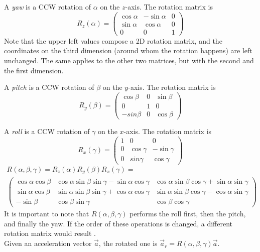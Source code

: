 A \textit{yaw} is a CCW rotation of $\alpha$ on the $z$-axis. The rotation matrix is
\[
	R_z(\alpha) =
	\begin{pmatrix}
		\cos\alpha & -\sin\alpha & 0 \\
		\sin\alpha & \cos\alpha & 0 \\
		0 & 0 & 1
	\end{pmatrix}
\]
Note that the upper left values compose a 2D rotation matrix, and the coordinates on the third dimension (around whom the rotation happens) are left unchanged. The same applies to the other two matrices, but with the second and the first dimension.
\bigbreak

A \textit{pitch} is a CCW rotation of $\beta$ on the $y$-axis. The rotation matrix is
\[
	R_y(\beta) =
	\begin{pmatrix}
		\cos\beta & 0 & \sin\beta \\
		0 & 1 & 0 \\
		-sin\beta & 0 & \cos\beta
	\end{pmatrix}
\]

A \textit{roll} is a CCW rotation of $\gamma$ on the $x$-axis. The rotation matrix is
\[
	R_x(\gamma) =
	\begin{pmatrix}
		1 & 0 & 0 \\
		0 & \cos\gamma & -\sin\gamma \\
		0 & sin\gamma & \cos\gamma
	\end{pmatrix}
\]
\begin{gather*}
	R(\alpha, \beta, \gamma) = R_z(\alpha) R_y(\beta) R_x(\gamma) = \\
	\begin{pmatrix}
		\cos\alpha \cos\beta & \cos\alpha \sin\beta \sin\gamma - \sin\alpha \cos\gamma & \cos\alpha \sin\beta \cos\gamma + \sin\alpha \sin\gamma \\
		\sin\alpha \cos\beta & \sin\alpha \sin\beta \sin\gamma + \cos\alpha \cos\gamma & \sin\alpha \sin\beta \cos\gamma - \cos\alpha \sin\gamma \\
		-\sin\beta & \cos\beta \sin\gamma & \cos\beta \cos\gamma
	\end{pmatrix}
\end{gather*}
It is important to note that $R(\alpha, \beta, \gamma)$ performs the roll first, then the pitch, and finally the yaw. If the order of these operations is changed, a different rotation matrix would result \cite{Lav06}.\\
Given an acceleration vector $\vec a$, the rotated one is $\vec a_r = R(\alpha, \beta, \gamma) \vec a$.
\bigbreak

